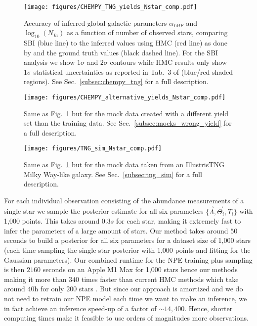 \documentclass{aa}
\begin{document}
\begin{figure*}
    \centering
    \texttt{[image: figures/CHEMPY\_TNG\_yields\_Nstar\_comp.pdf]}
    \vspace{-.5cm}
    \caption{Accuracy of inferred global galactic parameters $\alpha_{IMF}$ and $\log_{10}(N_{Ia})$ as a function of number of observed stars, comparing SBI (blue line) to the inferred values using HMC (red line) as done by \cite{Philcox_2019} and the ground truth values (black dashed line). For the SBI analysis we show $1\sigma$ and $2\sigma$ contours while HMC results only show $1\sigma$ statistical uncertainties as reported in Tab.~3 of \citet{Philcox_2019} (blue/red shaded regions). See Sec.~\ref{subsec:chempy_tng} for a full description.}
    \label{fig:CHEMPY_TNG_N_star_analysis}
\end{figure*}
\begin{figure*}
    \centering
    \texttt{[image: figures/CHEMPY\_alternative\_yields\_Nstar\_comp.pdf]}
    \vspace{-.5cm}
    \caption{Same as Fig.~\ref{fig:CHEMPY_TNG_N_star_analysis} but for the mock data created with a different yield set than the training data. See Sec.~\ref{subsec:mocks_wrong_yield} for a full description.}
    \label{fig:CHEMPY_alt_N_star_analysis}
\end{figure*}
\begin{figure*}
    \centering
    \texttt{[image: figures/TNG\_sim\_Nstar\_comp.pdf]}
    \vspace{-.5cm}
    \caption{Same as Fig.~\ref{fig:CHEMPY_TNG_N_star_analysis} but for the mock data taken from an IllustrisTNG Milky Way-like galaxy. See Sec.~\ref{subsec:tng_sim} for a full description.}
    \label{fig:TNG_N_star_analysis}
\end{figure*}

For each individual observation consisting of the abundance measurements of a single star we sample the posterior estimate for all six parameters $\{\vec\Lambda,\vec\Theta_i,T_i\}$ with 1,000 points. This takes around $0.3s$ for each star, making it extremely fast to infer the parameters of a large amount of stars. Our method takes around $50$ seconds to build a posterior for all six parameters for a dataset size of 1,000 stars (each time sampling the single star posterior with 1,000 points and fitting for the Gaussian parameters). Our combined runtime for the NPE training plus sampling is then $2160$ seconds on an Apple M1 Max for 1,000 stars hence our methods making it more than $340$ times faster than current HMC methods which take around $40$h for only $200$ stars \citep{Philcox_2019}. But since our approach is amortized and we do not need to retrain our NPE model each time we want to make an inference, we in fact achieve an inference speed-up of a factor of $\sim14,400$.
Hence, shorter computing times make it feasible to use orders of magnitudes more observations.
\end{document}
